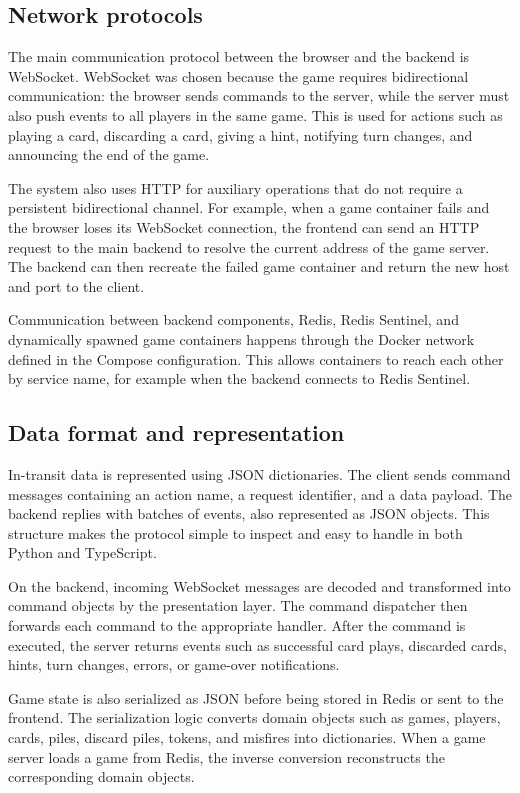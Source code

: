 \documentclass{scrartcl}
\begin{document}
\subsection{Network protocols}

The main communication protocol between the browser and the backend is WebSocket. 
WebSocket was chosen because the game requires bidirectional communication: the browser sends commands to the server, while the server must also push events to all players in the same game. 
This is used for actions such as playing a card, discarding a card, giving a hint, notifying turn changes, and announcing the end of the game.

The system also uses HTTP for auxiliary operations that do not require a persistent bidirectional channel. 
For example, when a game container fails and the browser loses its WebSocket connection, the frontend can send an HTTP request to the main backend to resolve the current address of the game server. 
The backend can then recreate the failed game container and return the new host and port to the client.

Communication between backend components, Redis, Redis Sentinel, and dynamically spawned game containers happens through the Docker network defined in the Compose configuration. 
This allows containers to reach each other by service name, for example when the backend connects to Redis Sentinel.

\subsection{Data format and representation}

In-transit data is represented using JSON dictionaries. 
The client sends command messages containing an action name, a request identifier, and a data payload. 
The backend replies with batches of events, also represented as JSON objects. 
This structure makes the protocol simple to inspect and easy to handle in both Python and TypeScript.

On the backend, incoming WebSocket messages are decoded and transformed into command objects by the presentation layer. 
The command dispatcher then forwards each command to the appropriate handler. 
After the command is executed, the server returns events such as successful card plays, discarded cards, hints, turn changes, errors, or game-over notifications.

Game state is also serialized as JSON before being stored in Redis or sent to the frontend. 
The serialization logic converts domain objects such as games, players, cards, piles, discard piles, tokens, and misfires into dictionaries. 
When a game server loads a game from Redis, the inverse conversion reconstructs the corresponding domain objects.
\end{document}
